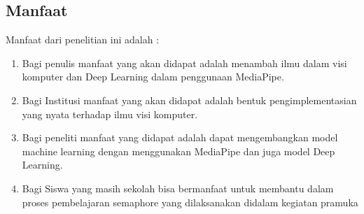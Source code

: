\subsection{Manfaat}

Manfaat dari penelitian ini adalah : 

\begin{enumerate}  
\item	Bagi penulis manfaat yang akan didapat adalah menambah ilmu dalam visi komputer dan Deep Learning dalam penggunaan MediaPipe.
\item	Bagi Institusi manfaat yang akan didapat adalah bentuk pengimplementasian yang nyata terhadap ilmu visi komputer.
\item	Bagi peneliti manfaat yang didapat adalah dapat mengembangkan model machine learning dengan menggunakan MediaPipe dan juga model Deep Learning.
\item	Bagi Siswa yang masih sekolah bisa bermanfaat untuk membantu dalam proses pembelajaran semaphore yang dilaksanakan didalam kegiatan pramuka
\end{enumerate}